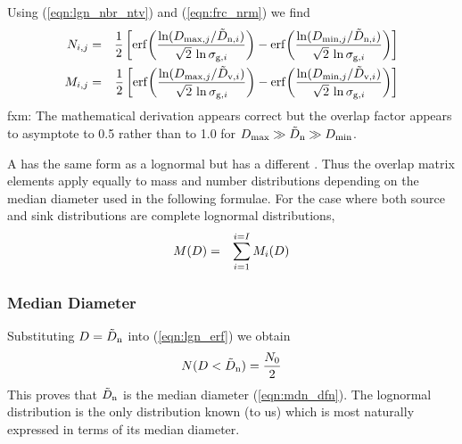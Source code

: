 \documentclass[12pt,twoside]{article}
\begin{document}
Using (\ref{eqn:lgn_nbr_ntv}) and (\ref{eqn:frc_nrm}) we find
\begin{eqnarray}
\label{eqn:ovr_nbr}
N_{i,j} & = & 
\frac{1}{2}
\left[
\mathrm{erf}\! \left( \frac{\ln (D_{\mathrm{max},j} / \tilde{D}_{\mathrm{n},i})}{\sqrt{2}\,\ln \sigma_{\mathrm{g},i} } \right) -
\mathrm{erf}\! \left( \frac{\ln (D_{\mathrm{min},j} / \tilde{D}_{\mathrm{n},i})}{\sqrt{2}\,\ln \sigma_{\mathrm{g},i} } \right)
\right] \\
\label{eqn:ovr_mss}
M_{i,j} & = &
\frac{1}{2}
\left[
\mathrm{erf}\! \left( \frac{\ln (D_{\mathrm{max},j} / \tilde{D}_{\mathrm{v},i})}{\sqrt{2}\,\ln \sigma_{\mathrm{g},i} } \right) -
\mathrm{erf}\! \left( \frac{\ln (D_{\mathrm{min},j} / \tilde{D}_{\mathrm{v},i})}{\sqrt{2}\,\ln \sigma_{\mathrm{g},i} } \right)
\right]
\end{eqnarray}
fxm: The mathematical derivation appears correct but the overlap
factor appears to asymptote to 0.5 rather than to 1.0 for $D_{\mathrm{max}} \gg
\tilde{D}_{\mathrm{n}} \gg D_{\mathrm{min}}$.

A  has the same form as a lognormal 
 but has a different . 
Thus the overlap matrix elements apply equally to mass and number
distributions depending on the median diameter used in the following
formulae. 
For the case where both source and sink distributions are complete
lognormal distributions, 
\begin{eqnarray}
M(D) & = & \sum_{i = 1}^{i=I} M_{i}(D) \nonumber
\label{eqn:mlt_mdl_lgn}
\end{eqnarray}

\subsubsection[Median Diameter]{Median Diameter}\label{sxn:mdn}
Substituting $D = \tilde{D}_{\mathrm{n}}$ into (\ref{eqn:lgn_erf}) we obtain
\begin{equation}
N(D < \tilde{D}_{\mathrm{n}}) = \frac{N_{0}}{2}
\label{eqn:lgn_mdn}
\end{equation}
This proves that $\tilde{D}_{\mathrm{n}}$ is the median diameter (\ref{eqn:mdn_dfn}). 
The lognormal distribution is the only distribution known (to us)
which is most naturally expressed in terms of its median diameter.
\end{document}
